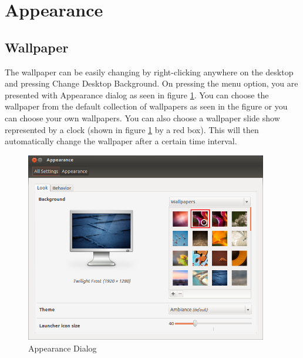 
\section{Appearance} 
\subsection*{Wallpaper} 
The wallpaper can be easily changing by right-clicking anywhere on the desktop and pressing Change Desktop Background. On pressing the menu option, you are presented with Appearance dialog as seen in figure \ref{fig:appearance-look}. You can choose the wallpaper from the default collection of wallpapers as seen in the figure or you can choose your own wallpapers. You can also choose a wallpaper slide show represented by a clock (shown in figure \ref{fig:appearance-look} by a red box). This will then automatically change the wallpaper after a certain time interval.

\begin{figure}[h!]	
	\centering
	\includegraphics[width=300pt]{./images/customize-ubuntu/appearance-look.png}
	\caption{Appearance Dialog}	
	\label{fig:appearance-look}		
\end{figure}

